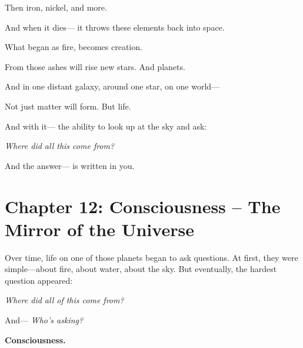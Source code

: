 \documentclass{article}
\begin{document}
\vspace{1ex}
\noindent
Then iron, nickel, and more.

\vspace{1ex}
\noindent
And when it dies—  
it throws these elements back into space.

\vspace{1ex}
\noindent
What began as fire,  
becomes creation.

\vspace{1ex}
\noindent
From those ashes will rise new stars.  
And planets.

\vspace{1ex}
\noindent
And in one distant galaxy,  
around one star,  
on one world—

\vspace{1ex}
\noindent
Not just matter will form.  
But life.

\vspace{1ex}
\noindent
And with it—  
the ability to look up at the sky and ask:

\vspace{1ex}
\begin{center}
\textit{Where did all this come from?}
\end{center}

\vspace{1ex}
\noindent
And the answer—  
is written in you.



\section*{Chapter 12: Consciousness – The Mirror of the Universe}

\noindent
Over time, life on one of those planets began to ask questions.  
At first, they were simple—about fire, about water, about the sky.  
But eventually, the hardest question appeared:

\vspace{1ex}
\begin{center}
\textit{Where did all of this come from?}
\end{center}

\vspace{1ex}
\noindent
And—  
\textit{Who’s asking?}

\vspace{1ex}
\noindent
\textbf{Consciousness.}
\end{document}
